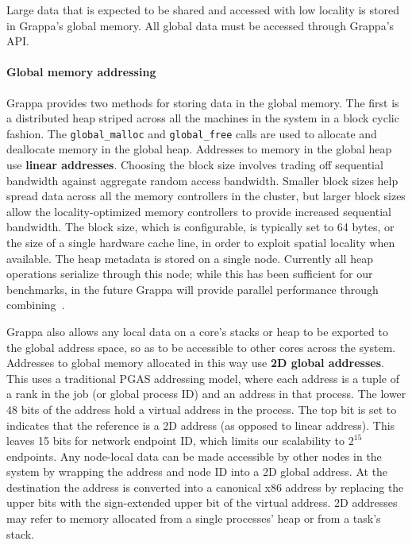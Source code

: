 Large data that is expected to be shared and accessed with low locality is stored in Grappa's global memory. All global data must be accessed through Grappa's API. %

\paragraph{Global memory addressing} Grappa provides two methods for storing data in the global memory. The first is a distributed heap striped across all the machines in the system in a block cyclic fashion. The \texttt{global\_malloc} and \texttt{global\_free} calls are used to allocate and deallocate memory in the global heap.  Addresses to memory in the global heap use \textbf{linear addresses}.  Choosing the block size involves trading off sequential bandwidth against aggregate random access bandwidth. Smaller block sizes help spread data across all the memory controllers in the cluster, but larger block sizes allow the locality-optimized memory controllers to provide increased sequential bandwidth. The block size, which is configurable, is typically set to 64 bytes, or the size of a single hardware cache line, in order to exploit spatial locality when available. The heap metadata is stored on a single node. Currently all heap operations serialize through this node; while this has been sufficient for our benchmarks, in the future Grappa will provide parallel performance through combining~\cite{MAMA,flatcombining}.

Grappa also allows any local data on a core's stacks or heap to be exported to the global address space, so as to be accessible to other cores across the system. Addresses to global memory allocated in this way use \textbf{2D global addresses}.  This uses a traditional PGAS addressing model, where each address is a tuple of a rank in the job (or global process ID) and an address in that process. The lower 48 bits of the address hold a virtual address in the process. The top bit is set to indicates that the reference is a 2D address (as opposed to linear address). This leaves 15 bits for network endpoint ID, which limits our scalability to $2^{15}$ endpoints. Any node-local data can be made accessible by other nodes in the system by wrapping the address and node ID into a 2D global address.  At the destination the address is converted into a canonical x86 address by replacing the upper bits with the sign-extended upper bit of the virtual address. 2D addresses may refer to memory allocated from a single processes' heap or from a task's stack.

